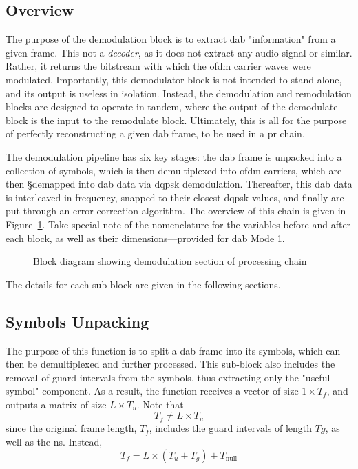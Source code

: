 \documentclass[class=report,11pt,crop=false]{standalone}
\begin{document}
\subsection{Overview}
The purpose of the demodulation block is to extract \gls{dab} "information" from a given frame. This not a \emph{decoder}, as it does not extract any audio signal or similar. Rather, it returns the bitstream with which the \gls{ofdm} carrier waves were modulated. Importantly, this demodulator block is not intended to stand alone, and its output is useless in isolation. Instead, the demodulation and remodulation blocks are designed to operate in tandem, where the output of the demodulate block is the input to the remodulate block. Ultimately, this is all for the purpose of perfectly reconstructing a given \gls{dab} frame, to be used in a \gls{pr} chain.

The demodulation pipeline has six key stages: the \gls{dab} frame is unpacked into a collection of symbols, which is then demultiplexed into \gls{ofdm} carriers, which are then §demapped into \gls{dab} data via \gls{dqpsk} demodulation. Thereafter, this \gls{dab} data is interleaved in frequency, snapped to their closest \gls{dqpsk} values, and finally are put through an error-correction algorithm. The overview of this chain is given in Figure~\ref{fig:BD_Demod_All}. Take special note of the nomenclature for the variables before and after each block, as well as their dimensions---provided for \gls{dab} Mode 1.

\begin{figure}[htbp]
    \centering
    \captionsetup{type=figure}
    \def\svgwidth{\linewidth}
    { %
        }
    \caption{Block diagram showing demodulation section of processing chain}
    \label{fig:BD_Demod_All}
\end{figure}

The details for each sub-block are given in the following sections.

\subsection{Symbols Unpacking \label{subsect:dab-proc_symbols-unpack}}
The purpose of this function is to split a \gls{dab} frame into its symbols, which can then be demultiplexed and further processed. This sub-block also includes the removal of guard intervals from the symbols, thus extracting only the "useful symbol" component. As a result, the function receives a vector of size \(1\times T_f\), and outputs a matrix of size \(L\times T_u\). Note that
\begin{equation}
  T_f \ne L\times T_u
\end{equation}
since the original frame length, \(T_f\), includes the guard intervals of length \(Tg\), as well as the \gls{ns}. Instead,
\begin{equation}
  T_f = L\times (T_u + T_g) + T_\mathrm{null}
\end{equation}
\end{document}
